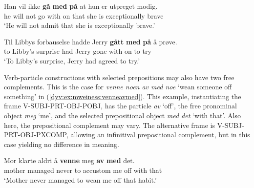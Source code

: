 \documentclass[output=paper]{langsci/langscibook}
\begin{document}
\ea\label{dyv:ex:mweiness:gåmedpå-2}
\gll   Han vil ikke \textbf{gå} \textbf{med} \textbf{på} at hun er utpreget modig. \\
        he will not go with on that she is exceptionally brave \\
\glt `He will not admit that she is exceptionally brave.' \\
\z

\ea\label{dyv:ex:mweiness:gåmedpå-3}
\gll   Til Libbys forbauselse hadde Jerry \textbf{gått} \textbf{med} \textbf{på} å prøve. \\
        to Libby's surprise had Jerry gone with on to try \\
\glt `To Libby's surprise, Jerry had agreed to try.' \\
\z




Verb-particle constructions with selected prepositions may also have two free complements. 
This is the case for \emph{venne noen av med noe} `wean someone off something' in (\ref{dyv:ex:mweiness:venneavmed}).
This example, instantiating the frame \textsf{V-SUBJ-PRT-OBJ-POBJ}, has the particle \emph{av} `off', the free pronominal object \emph{meg} `me', and the selected prepositional object \emph{med det} `with that'.
Also here, the prepositional complement may vary.
The alternative frame is \textsf{V-SUBJ-PRT-OBJ-PXCOMP}, allowing an infinitival prepositional complement, but in this case yielding no difference in meaning.

\ea\label{dyv:ex:mweiness:venneavmed}
\gll   Mor klarte aldri å \textbf{venne} meg \textbf{av} \textbf{med} det. \\
         mother managed never to accustom me off with that \\
\glt `{Mother} never managed to wean me off that habit.' \\
\z

\end{document}
